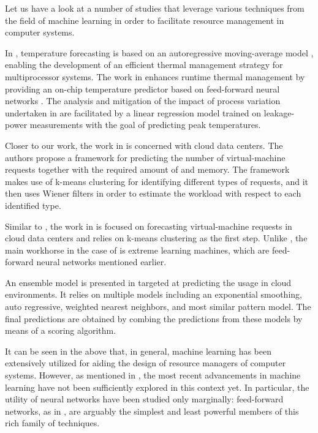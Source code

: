 Let us have a look at a number of studies that leverage various techniques from
the field of machine learning in order to facilitate resource management in
computer systems.

In \cite{coskun2008}, temperature forecasting is based on an autoregressive
moving-average model \cite{hastie2009}, enabling the development of an efficient
thermal management strategy for multiprocessor systems. The work in
\cite{kumar2010} enhances runtime thermal management by providing an on-chip
temperature predictor based on feed-forward neural networks \cite{hastie2009}.
The analysis and mitigation of the impact of process variation undertaken in
\cite{juan2014} are facilitated by a linear regression model \cite{hastie2009}
trained on leakage-power measurements with the goal of predicting peak
temperatures.

Closer to our work, the work in \cite{dabbagh2015} is concerned with cloud data
centers. The authors propose a framework for predicting the number of
virtual-machine requests together with the required amount of  and
memory. The framework makes use of k-means clustering \cite{hastie2009} for
identifying different types of requests, and it then uses Wiener filters in
order to estimate the workload with respect to each identified type.

Similar to \cite{dabbagh2015}, the work in \cite{ismaeel2015} is focused on
forecasting virtual-machine requests in cloud data centers and relies on k-means
clustering as the first step. Unlike \cite{dabbagh2015}, the main workhorse in
the case of \cite{ismaeel2015} is extreme learning machines, which are
feed-forward neural networks mentioned earlier.

An ensemble model \cite{hastie2009} is presented in \cite{cao2014} targeted at
predicting the  usage in cloud environments. It relies on multiple
models including an exponential smoothing, auto regressive, weighted nearest
neighbors, and most similar pattern model. The final predictions are obtained by
combing the predictions from these models by means of a scoring algorithm.

It can be seen in the above that, in general, machine learning has been
extensively utilized for aiding the design of resource managers of computer
systems. However, as mentioned in , the most recent
advancements in machine learning have not been sufficiently explored in this
context yet. In particular, the utility of neural networks have been studied
only marginally: feed-forward networks, as in \cite{kumar2010, ismaeel2015}, are
arguably the simplest and least powerful members of this rich family of
techniques.

